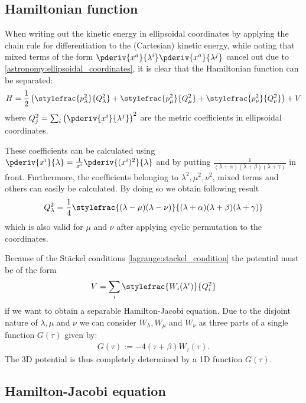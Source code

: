 \subsection{Hamiltonian function}

    When writing out the kinetic energy in ellipsoidal coordinates by applying the chain rule for differentiation to the (Cartesian) kinetic energy, while noting that mixed terms of the form $\pderiv{x^a}{\lambda^i}\pderiv{x^a}{\lambda^j}$ cancel out due to \ref{astronomy:ellipsoidal_coordinates}, it is clear that the Hamiltonian function can be separated:
    \begin{gather}
        H = \frac{1}{2}\left(\stylefrac{p_\lambda^2}{Q_\lambda^2} + \stylefrac{p_\mu^2}{Q_\mu^2} + \stylefrac{p_\nu^2}{Q_\nu^2}\right) + V
    \end{gather}
    where $Q_j^2 = \sum_i\left(\pderiv{x^i}{\lambda^j}\right)^2$ are the metric coefficients in ellipsoidal coordinates.

    These coefficients can be calculated using $\pderiv{x^i}{\lambda} = \frac{1}{x^i}\pderiv{(x^i)^2}{\lambda}$ and by putting $\frac{1}{(\lambda + \alpha)(\lambda + \beta)(\lambda + \gamma)}$ in front. Furthermore, the coefficients belonging to $\lambda^2, \mu^2, \nu^2$, mixed terms and others can easily be calculated. By doing so we obtain following result
    \begin{gather}
        Q_\lambda^2 = \frac{1}{4}\stylefrac{(\lambda - \mu)(\lambda - \nu)}{(\lambda + \alpha)(\lambda + \beta)(\lambda + \gamma)}
    \end{gather}
    which is also valid for $\mu$ and $\nu$ after applying cyclic permutation to the coordinates.

    Because of the St\"ackel conditions \ref{lagrange:stackel_condition} the potential must be of the form
    \begin{gather}
        V = \sum_i\stylefrac{W_i(\lambda^i)}{Q_i^2}
    \end{gather}
    if we want to obtain a separable Hamilton-Jacobi equation. Due to the disjoint nature of $\lambda, \mu$ and $\nu$ we can consider $W_\lambda, W_\mu$ and $W_\nu$ as three parts of a single function $G(\tau)$ given by:
    \begin{gather}
        G(\tau) := -4(\tau + \beta)W_\tau(\tau).
    \end{gather}
    The 3D potential is thus completely determined by a 1D function $G(\tau)$.

\subsection{Hamilton-Jacobi equation}

